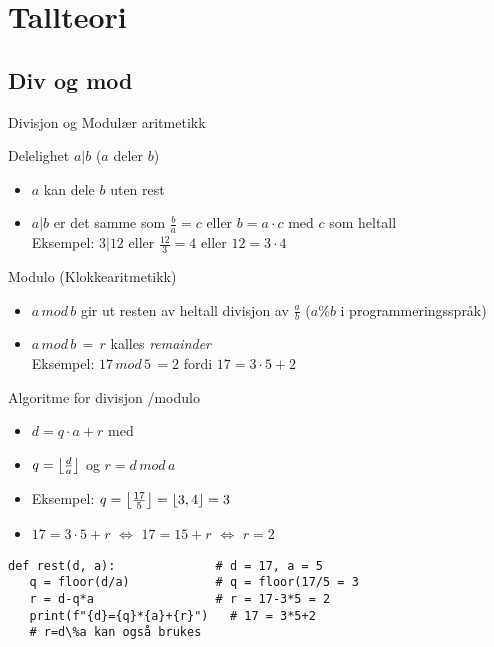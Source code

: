 \section{Tallteori}
\subsection*{Div og mod}
\begin{frame}{Divisjon og Modulær aritmetikk}
\begin{block}{Delelighet $a|b$ ($a$ deler $b$)}
\begin{itemize}
\item $a$ kan dele $b$ uten rest
\item $a|b$ er det samme som $\frac{b}{a}=c$ eller $b=a\cdot c$ med $c$ som heltall\\
Eksempel: $3|12$ eller $\frac{12}{3} = 4$ eller $12=3\cdot 4$
\end{itemize}
\end{block}

\begin{block}{Modulo (Klokkearitmetikk)}
\begin{itemize}
\item $a\, mod\, b$ gir ut resten av heltall divisjon av $\frac{a}{b}$ ($a\%b$ i programmeringsspråk)
\item $a\, mod\, b\, =\, r$ kalles \textit{remainder}\\
Eksempel: $17\, mod\, 5\, = 2$ fordi $17=3\cdot 5+2$ 
\end{itemize}
\end{block}
\end{frame}

\begin{frame}[fragile]{Algoritme for divisjon /modulo}
\begin{itemize}
\item $d=q\cdot a + r$ med
\item $q=\floor*{\frac{d}{a}}$ og $r=d\, mod\, a$
\item Eksempel: $q=\floor*{\frac{17}{5}} = \floor*{3,4}=3$
\item $17=3\cdot 5 + r$ $\iff$ $17=15+r$ $\iff$ $r=2$
\end{itemize}
\begin{verbatim}
def rest(d, a):              # d = 17, a = 5
   q = floor(d/a)            # q = floor(17/5 = 3
   r = d-q*a                 # r = 17-3*5 = 2
   print(f"{d}={q}*{a}+{r}")   # 17 = 3*5+2
   # r=d\%a kan også brukes
   
\end{verbatim}
\end{frame}

